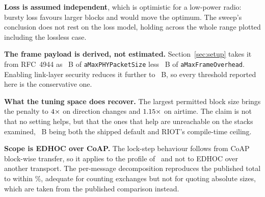 \textbf{Loss is assumed independent}, which is optimistic for a low-power radio: bursty loss
favours larger blocks and would move the optimum. The sweep's conclusion does not rest on the
loss model, holding across the whole range plotted including the lossless case.

\textbf{The frame payload is derived, not estimated.} Section~\ref{sec:setup} takes it from
RFC~4944 as \numFramePayloadFrame~B of \texttt{aMaxPHYPacketSize} less \numMacOverhead~B of
\texttt{aMaxFrameOverhead}. Enabling link-layer security reduces it further to
\numFramePayloadSecured~B, so every threshold reported here is the conservative one.

\textbf{What the tuning space does recover.} The largest permitted block size brings the
penalty to $4\times$ on direction changes and $1.15\times$ on
airtime. The claim is not that no setting helps, but that the ones that help are unreachable
on the stacks examined, \numCoapBlock~B being both the shipped default and RIOT's
compile-time ceiling.

\textbf{Scope is EDHOC over CoAP.} The lock-step behaviour follows from CoAP block-wise
transfer, so it applies to the profile of~\cite{rfc9668} and not to EDHOC over another
transport. The per-message decomposition reproduces the published total to within
\numDecompError\%, adequate for counting exchanges but not for quoting absolute sizes, which
are taken from the published comparison instead.
